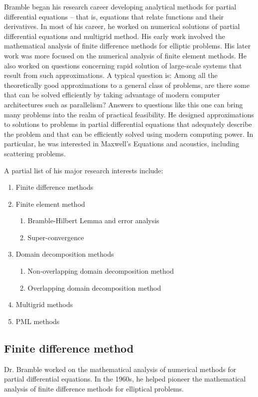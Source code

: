 \documentclass[CJK,11pt]{amsart}
\theoremstyle{definition}
\begin{document}
\begin{CJK*}{UTF8}{gbsn}
Bramble began his research career developing analytical methods for
partial differential equations -- that is, equations that relate
functions and their derivatives.  In most of his career, he worked on
numerical solutions of partial differential equations and multigrid
method. His early work involved the mathematical analysis of finite
difference methods for elliptic problems. His later work was more
focused on the numerical analysis of finite element methods.  He also
worked on questions concerning rapid solution of large-scale systems
that result from such approximations. A typical question is: Among all
the theoretically good approximations to a general class of problems,
are there some that can be solved efficiently by taking advantage of
modern computer architectures such as parallelism? Answers to
questions like this one can bring many problems into the realm of
practical feasibility. He designed approximations to solutions to
problems in partial differential equations that adequately describe
the problem and that can be efficiently solved using modern computing
power. In particular, he was interested in Maxwell's Equations and acoustics,
including scattering problems.

A partial list of his major research interests include:
\begin{enumerate}
\item Finite difference methods
\item Finite element method
\begin{enumerate}
\item Bramble-Hilbert Lemma and error analysis
\item Super-convergence
\end{enumerate}
\item Domain decomposition methods 
\begin{enumerate}
\item Non-overlapping domain decomposition method
\item Overlapping domain decomposition method
  \end{enumerate}
\item Multigrid methods 
\item PML methods 
\end{enumerate}
\subsection{Finite difference method}
Dr. Bramble worked on the mathematical analysis of numerical methods
for partial differential equations. In the 1960s, he helped pioneer
the mathematical analysis of finite difference methods for elliptical
problems.


\end{CJK*}
\end{document}
